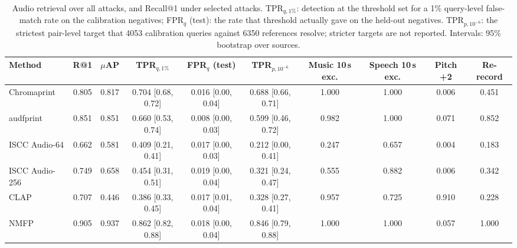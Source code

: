 \begin{table}[!t]
\centering
\scriptsize
\caption{Audio retrieval over all attacks, and Recall@1 under selected attacks. TPR$_{q,1\%}$: detection at the threshold set for a 1\% query-level false-match rate on the calibration negatives; FPR$_q$ (test): the rate that threshold actually gave on the held-out negatives. TPR$_{p,10^{-6}}$: the strictest pair-level target that 4053 calibration queries against 6350 references resolve; stricter targets are not reported. Intervals: 95\% bootstrap over sources.}
\label{tab:audio}
\setlength{\tabcolsep}{3pt}
\begin{tabular}{lccccccccc}
\toprule
Method & R@1 & $\mu$AP & TPR$_{q,1\%}$ & FPR$_{q}$ (test) & TPR$_{p,10^{-6}}$ & Music 10\,s exc. & Speech 10\,s exc. & Pitch +2 & Re-record \\
\midrule
Chromaprint & 0.805 & 0.817 & 0.704 \tiny[0.68, 0.72] & 0.016 \tiny[0.00, 0.04] & 0.688 \tiny[0.66, 0.71] & 1.000 & 1.000 & 0.006 & 0.451 \\
audfprint & 0.851 & 0.851 & 0.660 \tiny[0.53, 0.74] & 0.008 \tiny[0.00, 0.03] & 0.599 \tiny[0.46, 0.72] & 0.982 & 1.000 & 0.071 & 0.852 \\
ISCC Audio-64 & 0.662 & 0.581 & 0.409 \tiny[0.21, 0.41] & 0.017 \tiny[0.00, 0.03] & 0.212 \tiny[0.00, 0.41] & 0.247 & 0.657 & 0.004 & 0.183 \\
ISCC Audio-256 & 0.749 & 0.658 & 0.454 \tiny[0.31, 0.51] & 0.019 \tiny[0.00, 0.04] & 0.321 \tiny[0.24, 0.47] & 0.555 & 0.882 & 0.006 & 0.342 \\
CLAP & 0.707 & 0.446 & 0.386 \tiny[0.33, 0.45] & 0.017 \tiny[0.01, 0.04] & 0.328 \tiny[0.27, 0.41] & 0.957 & 0.725 & 0.910 & 0.228 \\
NMFP & 0.905 & 0.937 & 0.862 \tiny[0.82, 0.88] & 0.018 \tiny[0.00, 0.04] & 0.846 \tiny[0.79, 0.88] & 1.000 & 1.000 & 0.057 & 1.000 \\
\bottomrule
\end{tabular}

\end{table}
